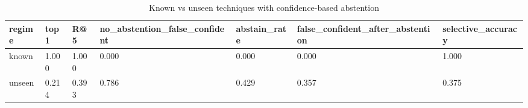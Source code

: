 \begin{table}[t]\centering\caption{Known vs unseen techniques with confidence-based abstention}
\begin{tabular}{lllllll}\hline
regime & top1 & R@5 & no\_abstention\_false\_confident & abstain\_rate & false\_confident\_after\_abstention & selective\_accuracy \\\hline
known & 1.000 & 1.000 & 0.000 & 0.000 & 0.000 & 1.000 \\
unseen & 0.214 & 0.393 & 0.786 & 0.429 & 0.357 & 0.375 \\
\hline\end{tabular}\end{table}
